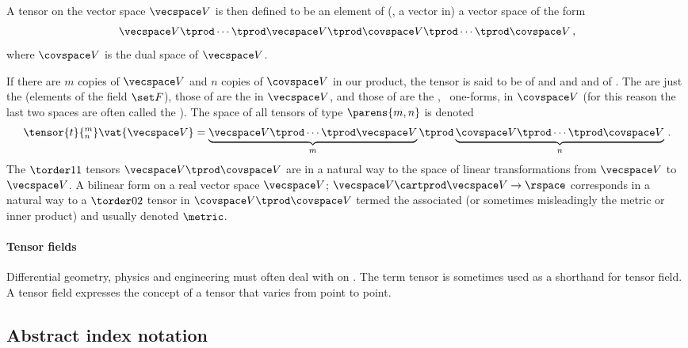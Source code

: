 A tensor on the vector space $\vecspace V$ is then defined to be an element of (\ie, a vector in) a vector space of the form
%
\begin{equation*}
  \vecspace V\tprod\dotsb\tprod\vecspace V\tprod\covspace V\tprod\dotsb\tprod\covspace V\,,
\end{equation*}
%
where $\covspace V$ is the dual space of $\vecspace V$.

If there are $m$ copies of $\vecspace V$ and $n$ copies of $\covspace V$ in our product, the tensor is said to be of  and  and  and of . The  are just the  (elements of the field $\set F$), those of  are the  in $\vecspace V$, and those of  are the , \aka\ one-forms, in $\covspace V$ (for this reason the last two spaces are often called the ). The space of all tensors of type $\parens{m,n}$ is denoted
%
\begin{equation*}
  \tensor{t}{^m_n}\vat{\vecspace V} = \underbrace{\vecspace V\tprod\dotsb\tprod\vecspace V}_{m}\tprod
                                      \underbrace{\covspace V\tprod\dotsb\tprod\covspace V}_{n}\,.
\end{equation*}
%
The $\torder 11$ tensors $\vecspace V\tprod\covspace V$ are  in a natural way to the space of linear transformations from $\vecspace V$ to $\vecspace V$. A bilinear form on a real vector space $\vecspace V$; $\vecspace V\cartprod\vecspace V\to\rspace$ corresponds in a natural way to a $\torder 02$ tensor in $\covspace V\tprod\covspace V$ termed the associated  (or sometimes misleadingly the metric or inner product) and usually denoted $\metric$.

\paragraph{Tensor fields} Differential geometry, physics and engineering must often deal with  on . The term tensor is sometimes used as a shorthand for tensor field. A tensor field expresses the concept of a tensor that varies from point to point.

\providecommand*{\cov}[1]{\tilde{#1}}


\subsection{Abstract index notation}

